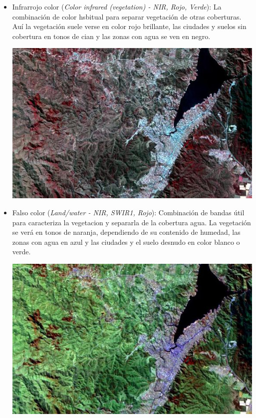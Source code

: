 \documentclass[a4paper,12pt]{book}
\begin{document}
\begin{itemize}
    \item Infrarrojo color (\emph{Color infrared (vegetation) - NIR, Rojo, Verde}): La combinación de color hsbitual para separar vegetación de otras coberturas. Auí la vegetación suele verse en color rojo brillante, las ciudades y suelos sin cobertura en tonos de cian y las zonas con agua se ven en negro.
    \begin{center}\includegraphics[scale=0.3]{8-4-3.jpeg}\end{center}
    \item Falso color (\emph{Land/water - NIR, SWIR1, Rojo}): Combinación de bandas útil para caracteriza la vegetacion y separarla de la cobertura agua. La vegetación se verá en tonos de naranja, dependiendo de su contenido de humedad, las zonas con agua en azul y las ciudades y el suelo desnudo en  color blanco o verde.
    \begin{center}\includegraphics[scale=0.3]{8-11-4.jpeg}\end{center}
\end{itemize}
\end{document}
